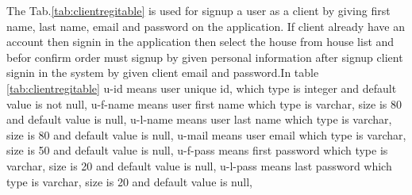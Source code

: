 \documentclass[12pt,a4paper]{report}
\begin{document}
\begin{table}[H]
\begin{tabular}{M{0.6cm}|M{1.5cm}|M{2cm}|M{1cm}|M{1cm}|M{2.5cm}|M{3.2cm}N}
	\end{tabular}
	\end{table}The Tab.\ref{tab:clientregitable} is used for signup a user as a client by giving first name, last name, email and password on the application. If client already have an account then signin in the application then select the house from house list and befor confirm order must signup by given personal information after signup client signin in the system by given client email and password.In table \ref{tab:clientregitable} u-id means user unique id, which type is integer and default value is not null, u-f-name means user first name which type is varchar, size is 80 and default value is null, u-l-name means user last name which type is varchar, size is 80 and default value is null, u-mail means user email which type is varchar, size is 50 and default value is null, u-f-pass means first password which type is varchar, size is 20 and default value is null, u-l-pass means last password which type is varchar, size is 20 and default value is null,
\end{document}
